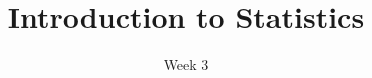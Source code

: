 \title{Introduction to Statistics}
\date{Week 3}





\thispagestyle{plain}
\graphicspath{{lectures/week03/}}




